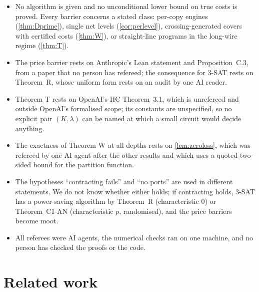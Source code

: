 \documentclass[10pt]{amsart}
\theoremstyle{plain}
\theoremstyle{definition}
\theoremstyle{remark}
\numberwithin{equation}{section}
\begin{document}
\begin{itemize}
\item No algorithm is given and no unconditional lower bound on true costs is proved. Every barrier concerns a
stated class: per-copy engines (\cref{thm:Dprime}), single net levels (\cref{cor:perlevel}), crossing-generated
covers with certified costs (\cref{thm:W}), or straight-line programs in the long-wire regime (\cref{thm:T}).
\item The price barrier rests on Anthropic's Lean statement  and Proposition~C.3, from
a paper that no person has refereed; the consequence for 3-SAT rests on Theorem~R, whose uniform form rests on
an audit by one AI reader.
\item Theorem T rests on OpenAI's HC Theorem~3.1, which is unrefereed and outside OpenAI's formalised scope;
its constants are unspecified, so no explicit pair $(K,\lambda)$ can be named at which a small circuit would
decide anything.
\item The exactness of Theorem W at all depths rests on \cref{lem:zeroloss}, which was refereed by one AI agent
after the other results and which uses a quoted two-sided bound for the partition function.
\item The hypotheses ``contracting fails'' and ``no ports'' are used in different statements. We do not know
whether either holds; if contracting holds, 3-SAT has a power-saving algorithm by Theorem~R (characteristic
$0$) or Theorem~C1-AN (characteristic $p$, randomised), and the price barriers become moot.
\item All referees were AI agents, the numerical checks ran on one machine, and no person has checked the proofs
or the code.
\end{itemize}

\section{Related work}\label{sec:related}
\end{document}
